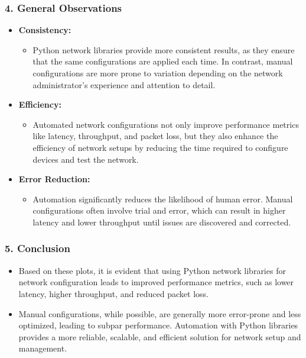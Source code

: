 \documentclass[11pt]{article}
\providecommand{\tightlist}{%
      \setlength{\itemsep}{0pt}\setlength{\parskip}{0pt}}
\begin{document}
\hypertarget{general-observations}{%
\subsubsection{\texorpdfstring{4. \textbf{General
Observations}}{4. General Observations}}\label{general-observations}}

\begin{itemize}
\tightlist
\item
  \textbf{Consistency:}

  \begin{itemize}
  \tightlist
  \item
    Python network libraries provide more consistent results, as they
    ensure that the same configurations are applied each time. In
    contrast, manual configurations are more prone to variation
    depending on the network administrator's experience and attention to
    detail.
  \end{itemize}
\item
  \textbf{Efficiency:}

  \begin{itemize}
  \tightlist
  \item
    Automated network configurations not only improve performance
    metrics like latency, throughput, and packet loss, but they also
    enhance the efficiency of network setups by reducing the time
    required to configure devices and test the network.
  \end{itemize}
\item
  \textbf{Error Reduction:}

  \begin{itemize}
  \tightlist
  \item
    Automation significantly reduces the likelihood of human error.
    Manual configurations often involve trial and error, which can
    result in higher latency and lower throughput until issues are
    discovered and corrected.
  \end{itemize}
\end{itemize}

\hypertarget{conclusion}{%
\subsubsection{\texorpdfstring{5.
\textbf{Conclusion}}{5. Conclusion}}\label{conclusion}}

\begin{itemize}
\tightlist
\item
  Based on these plots, it is evident that using Python network
  libraries for network configuration leads to improved performance
  metrics, such as lower latency, higher throughput, and reduced packet
  loss.
\item
  Manual configurations, while possible, are generally more error-prone
  and less optimized, leading to subpar performance. Automation with
  Python libraries provides a more reliable, scalable, and efficient
  solution for network setup and management.
\end{itemize}
\end{document}
